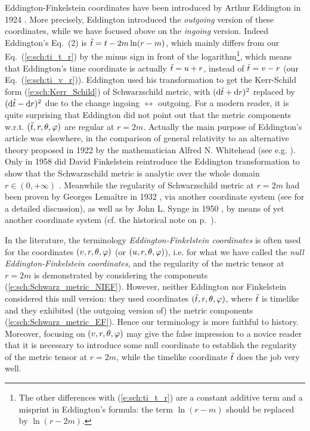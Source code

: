 \begin{hist}
Eddington-Finkelstein coordinates have been introduced by
Arthur Eddington in 1924 \cite{Eddin1924}. More precisely, Eddington
introduced the \emph{outgoing} version of these coordinates,
while we have focused above on the \emph{ingoing} version. Indeed
Eddington's Eq.~(2) is ${\tilde t} = t - 2m \ln(r-m)$, which mainly differs from
our Eq.~(\ref{e:sch:ti_t_r}) by the minus sign in front of the logarithm\footnote{The other differences with (\ref{e:sch:ti_t_r}) are a constant additive term
and a misprint in Eddington's formula: the term $\ln(r-m)$ should be replaced
by $\ln(r-2m)$.},
which means that Eddington's time coordinate is actually ${\tilde t} = u + r$, instead of
${\tilde t} = v - r$ (our Eq.~(\ref{e:sch:ti_v_r})). Eddington used his transformation
to get the Kerr-Schild form (\ref{e:sch:Kerr_Schild}) of Schwarzschild metric,
with $(\mathrm{d} {\tilde t} + \mathrm{d} r)^2$ replaced by $(\mathrm{d} {\tilde t} - \mathrm{d} r)^2$ due to the change
ingoing $\leftrightarrow$ outgoing. For a modern reader, it is quite surprising
that Eddington did not point out that the metric components w.r.t. $({\tilde t},r,\theta,\varphi)$
are regular at $r=2m$. Actually the main purpose of Eddington's article
\cite{Eddin1924} was elsewhere, in the comparison of general relativity to an alternative theory proposed in 1922 by the mathematician Alfred N. Whitehead
(see e.g. \cite{GibboW08}).
Only in 1958 did David Finkelstein reintroduce the Eddington transformation
to show that the Schwarzschild metric is analytic over the whole domain
$r\in(0,+\infty)$ \cite{Finke58}. Meanwhile the regularity of Schwarzschild metric
at $r=2m$ had been proven by Georges Lemaître in 1932 \cite{Lemai32}, via
another coordinate system (see \cite{Eisen93} for a detailed discussion),
as well as by John L. Synge in 1950 \cite{Synge50}, by means of yet another coordinate
system (cf. the historical note on p.~\pageref{n:max:KS_coord}).
\end{hist}

\begin{remark}
In the literature, the terminology \emph{Eddington-Finkelstein coordinates}
is often used for the coordinates $(v,r,\theta,\varphi)$ (or $(u,r,\theta,\varphi)$),
i.e. for what we have called the \emph{null Eddington-Finkelstein coordinates},
and the regularity of the metric tensor at $r=2m$ is demonstrated by
considering the components (\ref{e:sch:Schwarz_metric_NIEF}).
However, neither
Eddington \cite{Eddin1924} nor Finkelstein \cite{Finke58}
considered this null version: they used coordinates $({\tilde t},r,\theta,\varphi)$, where
${\tilde t}$ is timelike and they exhibited (the outgoing version of) the
metric components (\ref{e:sch:Schwarz_metric_EF}).
Hence our terminology is more faithful to history. Moreover, focusing on
$(v,r,\theta,\varphi)$ may give the false impression to a novice reader that it is
necessary to introduce some null coordinate to establish the regularity
of the metric tensor at $r=2m$, while the timelike coordinate ${\tilde t}$
does the job very well.
\end{remark}

